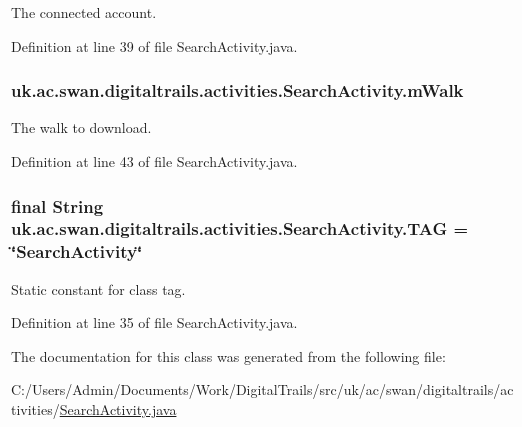 The connected account. 



Definition at line 39 of file Search\+Activity.\+java.

\hypertarget{classuk_1_1ac_1_1swan_1_1digitaltrails_1_1activities_1_1_search_activity_a82ce8c4a076d6d9e1cb5595034be7c6b}{
\subsubsection[{m\+Walk}]{ uk.\+ac.\+swan.\+digitaltrails.\+activities.\+Search\+Activity.\+m\+Walk\hspace{0.3cm}{\ttfamily [private]}}}\label{classuk_1_1ac_1_1swan_1_1digitaltrails_1_1activities_1_1_search_activity_a82ce8c4a076d6d9e1cb5595034be7c6b}


The walk to download. 



Definition at line 43 of file Search\+Activity.\+java.

\hypertarget{classuk_1_1ac_1_1swan_1_1digitaltrails_1_1activities_1_1_search_activity_a0c23cfe7dac0b9b46a17a05a96073bd7}{
\subsubsection[{T\+A\+G}]{\setlength{\rightskip}{0pt plus 5cm}final String uk.\+ac.\+swan.\+digitaltrails.\+activities.\+Search\+Activity.\+T\+A\+G = \char`\"{}Search\+Activity\char`\"{}\hspace{0.3cm}{\ttfamily [static]}}}\label{classuk_1_1ac_1_1swan_1_1digitaltrails_1_1activities_1_1_search_activity_a0c23cfe7dac0b9b46a17a05a96073bd7}


Static constant for class tag. 



Definition at line 35 of file Search\+Activity.\+java.



The documentation for this class was generated from the following file\+:\begin{DoxyCompactItemize}
\item 
C\+:/\+Users/\+Admin/\+Documents/\+Work/\+Digital\+Trails/src/uk/ac/swan/digitaltrails/activities/\hyperlink{_search_activity_8java}{Search\+Activity.\+java}\end{DoxyCompactItemize}
